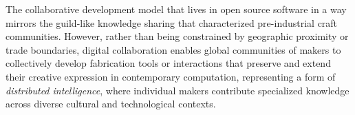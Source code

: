\vspace{0.5cm}

The collaborative development model that lives in open source software in a way mirrors the guild-like knowledge sharing that characterized pre-industrial craft communities. However, rather than being constrained by geographic proximity or trade boundaries, digital collaboration enables global communities of makers to collectively develop fabrication tools or interactions that preserve and extend their creative expression in contemporary computation, representing a form of \textit{distributed intelligence}, where individual makers contribute specialized knowledge across diverse cultural and technological contexts.